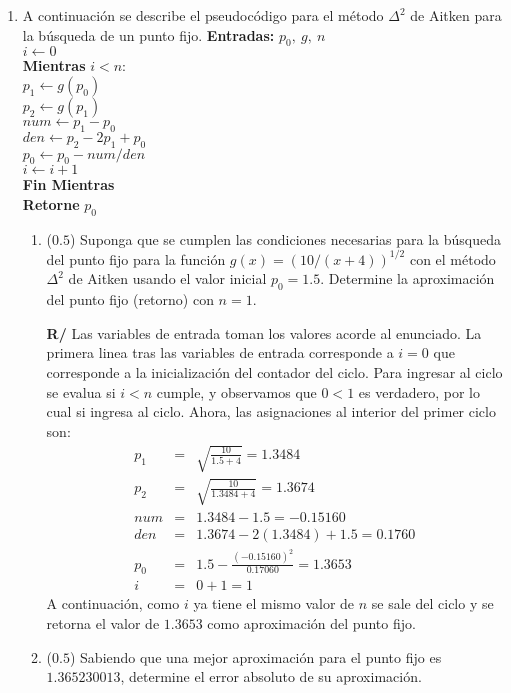 \documentclass[12pt]{article}
\begin{document}
\vspace{-.5cm}
  \begin{enumerate}[leftmargin=*,widest=9]
    \item A continuación se describe el pseudocódigo para el método \(\Delta^2\) de Aitken para la búsqueda de un punto fijo.
    \small{
    \textbf{Entradas:} \(p_0, \ g, \ n\)\\
    \(i \gets 0\)\\
    \textbf{Mientras} \(i < n\):\\
    \hspace*{.5 cm} \(p_1 \gets g(p_0)\)\\
    \hspace*{.5 cm} \(p_2 \gets g(p_1)\)\\
    \hspace*{.5 cm} \(num \gets p_{1} - p_0\)\\
    \hspace*{.5 cm} \(den \gets p_{2} - 2p_{1} + p_0\)\\
    \hspace*{.5 cm} \(p_0 \gets p_0 - num / den \)\\
    \hspace*{.5 cm} \(i \gets i + 1\)\\
    \textbf{Fin Mientras}\\
    \textbf{Retorne} \(p_0\)
    }
    \begin{enumerate}[label=\alph*]
    \item (\(0.5\)) Suponga que se cumplen las condiciones necesarias para la búsqueda del punto fijo para la función \(g(x) = {(10/(x+4))}^{1/2}\)
    con el método \(\Delta^2\) de Aitken usando el valor inicial \(p_0=1.5\). Determine la aproximación del punto fijo (retorno) con \(n=1\).

\textbf{R/} Las variables de entrada toman los valores acorde al enunciado. La primera linea tras las variables de entrada corresponde a \(i=0\) que corresponde a la inicialización del contador del ciclo. Para ingresar al ciclo se evalua si \(i<n\) cumple, y observamos que \(0 < 1\) es verdadero, por lo cual si ingresa al ciclo. Ahora, las asignaciones al interior del primer ciclo son:
\begin{eqnarray*}
p_1 &=& \sqrt{\frac{10}{1.5 + 4}} = 1.3484 \\
p_2 &=& \sqrt{\frac{10}{1.3484 + 4}} = 1.3674 \\
num &=& 1.3484 - 1.5 = -0.15160\\
den &=& 1.3674 - 2(1.3484) + 1.5 = 0.1760\\
p_0 &=& 1.5 - \frac{{(-0.15160)}^2}{0.17060} = 1.3653\\
i &=& 0 + 1 = 1
\end{eqnarray*}
A continuación, como \(i\) ya tiene el mismo valor de \(n\) se sale del ciclo y se retorna el valor de %
\(1.3653\)
como aproximación del punto fijo.
    \item (\(0.5\)) Sabiendo que una mejor aproximación para el punto fijo es \(1.365230013\), determine el error absoluto de su aproximación.


\end{enumerate}
\end{enumerate}
\end{document}
